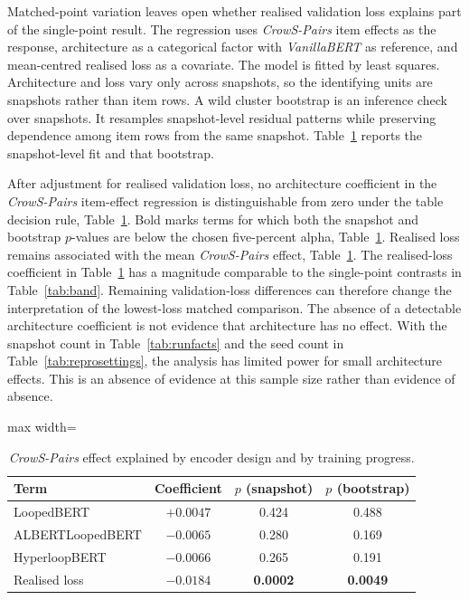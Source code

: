 \documentclass[sigconf,natbib=true,anonymous=true]{acmart}
\begin{document}
\label{sec:cont}
Matched-point variation leaves open whether realised validation loss explains
part of the single-point result. The regression uses \emph{CrowS-Pairs} item
effects as the response, architecture as a categorical factor with
\emph{VanillaBERT} as reference, and mean-centred realised loss as a covariate.
The model is fitted by least squares. Architecture and loss vary only across
snapshots, so the identifying units are snapshots rather than item rows. A wild
cluster bootstrap is an inference check over snapshots. It resamples
snapshot-level residual patterns while preserving dependence among item rows
from the same snapshot. Table~\ref{tab:model} reports the snapshot-level fit and
that bootstrap.

After adjustment for realised validation loss, no architecture coefficient in
the \emph{CrowS-Pairs} item-effect regression is distinguishable from zero under
the table decision rule, Table~\ref{tab:model}. Bold marks terms for which both
the snapshot and bootstrap $p$-values are below the chosen five-percent alpha,
Table~\ref{tab:model}. Realised loss remains associated with the mean
\emph{CrowS-Pairs} effect, Table~\ref{tab:model}. The realised-loss coefficient
in Table~\ref{tab:model} has a magnitude comparable to the single-point
contrasts in Table~\ref{tab:band}. Remaining validation-loss differences can
therefore change the interpretation of the lowest-loss matched comparison. The
absence of a detectable architecture coefficient is not evidence that
architecture has no effect. With the snapshot count in Table~\ref{tab:runfacts}
and the seed count in Table~\ref{tab:reprosettings}, the analysis has limited
power for small architecture effects. This is an absence of evidence at this
sample size rather than evidence of absence.

\begin{table}[t]
\centering
\caption{\emph{CrowS-Pairs} effect explained by encoder design and by training progress.}
\label{tab:model}
\footnotesize
\begin{adjustbox}{max width=\columnwidth}
\begin{tabular}{lccc}
\toprule
Term & Coefficient & $p$ (snapshot) & $p$ (bootstrap) \\
\midrule
LoopedBERT        & $+0.0047$ & 0.424 & 0.488 \\
ALBERTLoopedBERT  & $-0.0065$ & 0.280 & 0.169 \\
HyperloopBERT     & $-0.0066$ & 0.265 & 0.191 \\
Realised loss     & $-0.0184$ & \textbf{0.0002} & \textbf{0.0049} \\
\bottomrule
\end{tabular}
\end{adjustbox}
\end{table}
\end{document}
